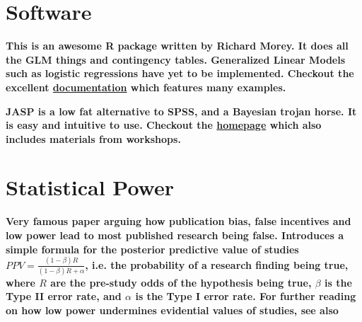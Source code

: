 \documentclass[12pt]{scrartcl}
\begin{document}
\section{Software}
\begin{description}
  \item {}
  
  \textbf{This is an awesome R package written by Richard Morey. It does all the GLM things and contingency tables. Generalized Linear Models such as logistic regressions have yet to be implemented. Checkout the excellent \href{http://bayesfactorpcl.r-forge.r-project.org/}{documentation} which features many examples.}
  
  \item {}
  
  \textbf{JASP is a low fat alternative to SPSS, and a Bayesian trojan horse. It is easy and intuitive to use. Checkout the \href{https://jasp-stats.org/}{homepage} which also includes materials from workshops.}
\end{description}




\section{Statistical Power}

\begin{description}
  \item {}
  
  \item {}
  
  \item {}
  
  \item {}
  
  \item {}
  
  \item {}
  
  \item {}
  
  \item {}
  
    \textbf{Very famous paper arguing how publication bias, false incentives and low power lead to most published research being false. Introduces a simple formula for the posterior predictive value of studies $PPV = \frac{(1 - \beta)R}{(1 - \beta)R + \alpha}$, i.e. the probability of a research finding being true, where $R$ are the pre-study odds of the hypothesis being true, $\beta$ is the Type II error rate, and $\alpha$ is the Type I error rate. For further reading on how low power undermines evidential values of studies, see also \cite{button2013power}}
\end{description}
\end{document}
